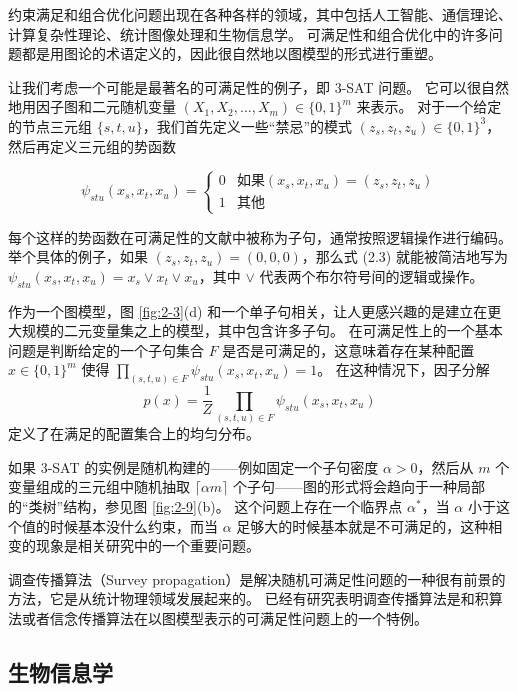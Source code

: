 约束满足和组合优化问题出现在各种各样的领域，其中包括人工智能、通信理论、计算复杂性理论、统计图像处理和生物信息学。
可满足性和组合优化中的许多问题都是用图论的术语定义的，因此很自然地以图模型的形式进行重塑。

让我们考虑一个可能是最著名的可满足性的例子，即 3-SAT 问题。
它可以很自然地用因子图和二元随机变量 $(X_1, X_2, \dots, X_m) \in \{0, 1\}^m$ 来表示。
对于一个给定的节点三元组 $\{s, t, u\}$，我们首先定义一些“禁忌”的模式 $(z_s, z_t, z_u) \in \{0, 1\}^3$，然后再定义三元组的势函数

\begin{equation}
    \psi_{stu}(x_s, x_t, x_u) = \begin{cases}
        0 & \text{如果} (x_s, x_t, x_u) = (z_s, z_t, z_u) \\
        1 & \text{其他}
    \end{cases}
\end{equation}

每个这样的势函数在可满足性的文献中被称为子句，通常按照逻辑操作进行编码。
举个具体的例子，如果 $(z_s, z_t, z_u) = (0, 0, 0)$，那么式 (2.3) 就能被简洁地写为 $\psi_{stu}(x_s, x_t, x_u) = x_s \vee x_t \vee x_u$，其中 $\vee$ 代表两个布尔符号间的逻辑或操作。

作为一个图模型，图 \ref{fig:2-3}(d) 和一个单子句相关，让人更感兴趣的是建立在更大规模的二元变量集之上的模型，其中包含许多子句。
在可满足性上的一个基本问题是判断给定的一个子句集合 $F$ 是否是可满足的，这意味着存在某种配置 $x \in \{0, 1\}^m$ 使得 $\prod_{(s, t, u) \in F}\psi_{stu}(x_s, x_t, x_u) = 1$。
在这种情况下，因子分解 $$p(x) = \frac{1}{Z}\prod_{(s, t, u) \in F}\psi_{stu}(x_s, x_t, x_u)$$ 定义了在满足的配置集合上的均匀分布。

如果 3-SAT 的实例是随机构建的——例如固定一个子句密度 $\alpha > 0$，然后从 $m$ 个变量组成的三元组中随机抽取 $\lceil\alpha m \rceil$ 个子句——图的形式将会趋向于一种局部的“类树”结构，参见图 \ref{fig:2-9}(b)。
这个问题上存在一个临界点 $\alpha^*$，当 $\alpha$ 小于这个值的时候基本没什么约束，而当 $\alpha$ 足够大的时候基本就是不可满足的，这种相变的现象是相关研究中的一个重要问题。

调查传播算法（Survey propagation）是解决随机可满足性问题的一种很有前景的方法，它是从统计物理领域发展起来的。
已经有研究表明调查传播算法是和积算法或者信念传播算法在以图模型表示的可满足性问题上的一个特例。

\subsection{生物信息学}

